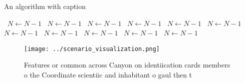 \documentclass[a4paper]{article}
\begin{document}
\begin{algorithm}
\caption{An algorithm with caption}
\begin{algorithmic}
\    \State $N \gets N - 1$
\    \State $N \gets N - 1$
\    \State $N \gets N - 1$
\    \State $N \gets N - 1$
\    \State $N \gets N - 1$
\    \State $N \gets N - 1$
\    \State $N \gets N - 1$
\    \State $N \gets N - 1$
\    \State $N \gets N - 1$
\    \State $N \gets N - 1$
\    \State $N \gets N - 1$
\EndWhile
\end{algorithmic}
\end{algorithm}

\begin{figure}
\centering
\texttt{[image: ../scenario\_visualization.png]}
\caption{Features or common across Canyon on identiication cards members o the Coordinate scientiic and inhabitant o gaul then t
}
\end{figure}
 
\end{document}
